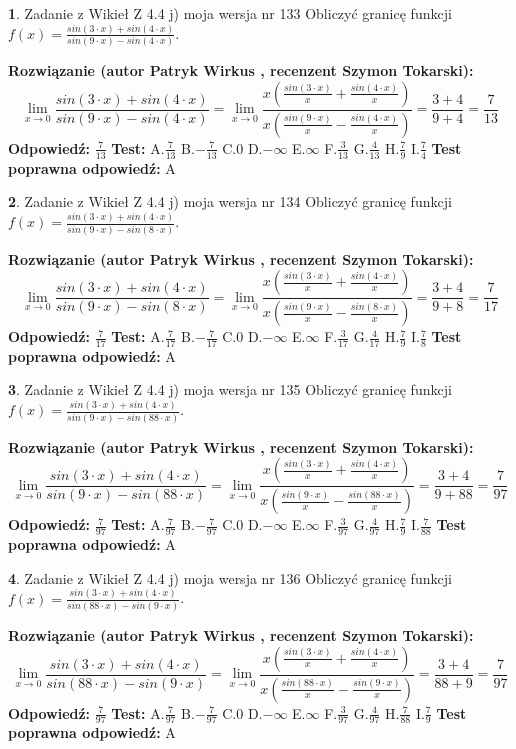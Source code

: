 \documentclass[12pt, a4paper]{article}
\theoremstyle{definition} %
\newtheorem{zad}{}
\newcommand{\zadStart}[1]{\begin{zad}#1\newline}
\newcommand{\zadStop}{\end{zad}}
\newcommand{\rozwStart}[2]{\noindent \textbf{Rozwiązanie (autor #1 , recenzent #2): }\newline}
\newcommand{\rozwStop}{\newline}
\newcommand{\odpStart}{\noindent \textbf{Odpowiedź:}\newline}
\newcommand{\odpStop}{\newline}
\newcommand{\testStart}{\noindent \textbf{Test:}\newline}
\newcommand{\testStop}{\newline}
\newcommand{\kluczStart}{\noindent \textbf{Test poprawna odpowiedź:}\newline}
\newcommand{\kluczStop}{\newline}
\begin{document}
\zadStart{Zadanie z Wikieł Z 4.4 j) moja wersja nr 133}
Obliczyć granicę funkcji $f(x)=\frac{sin(3\cdot x) +sin(4\cdot x)}{sin(9\cdot x) -sin(4\cdot x)}$.
\zadStop
\rozwStart{Patryk Wirkus}{Szymon Tokarski}
$$\lim\limits_{x\to 0}\frac{sin(3\cdot x) +sin(4\cdot x)}{sin(9\cdot x) -sin(4\cdot x)}=\lim\limits_{x\to 0}\frac{x(\frac{sin(3\cdot x)}{x}+\frac{sin(4\cdot x)}{x})}{x(\frac{sin(9\cdot x)}{x}-\frac{sin(4\cdot x)}{x})}=\frac{3+4}{9+4} = \frac{7}{13}$$
\rozwStop
\odpStart
$\frac{7}{13}$
\odpStop
\testStart
A.$\frac{7}{13}$
B.$-\frac{7}{13}$
C.$0$
D.$-\infty$
E.$\infty$
F.$\frac{3}{13}$
G.$\frac{4}{13}$
H.$\frac{7}{9}$
I.$\frac{7}{4}$
\testStop
\kluczStart
A
\kluczStop



\zadStart{Zadanie z Wikieł Z 4.4 j) moja wersja nr 134}
Obliczyć granicę funkcji $f(x)=\frac{sin(3\cdot x) +sin(4\cdot x)}{sin(9\cdot x) -sin(8\cdot x)}$.
\zadStop
\rozwStart{Patryk Wirkus}{Szymon Tokarski}
$$\lim\limits_{x\to 0}\frac{sin(3\cdot x) +sin(4\cdot x)}{sin(9\cdot x) -sin(8\cdot x)}=\lim\limits_{x\to 0}\frac{x(\frac{sin(3\cdot x)}{x}+\frac{sin(4\cdot x)}{x})}{x(\frac{sin(9\cdot x)}{x}-\frac{sin(8\cdot x)}{x})}=\frac{3+4}{9+8} = \frac{7}{17}$$
\rozwStop
\odpStart
$\frac{7}{17}$
\odpStop
\testStart
A.$\frac{7}{17}$
B.$-\frac{7}{17}$
C.$0$
D.$-\infty$
E.$\infty$
F.$\frac{3}{17}$
G.$\frac{4}{17}$
H.$\frac{7}{9}$
I.$\frac{7}{8}$
\testStop
\kluczStart
A
\kluczStop



\zadStart{Zadanie z Wikieł Z 4.4 j) moja wersja nr 135}
Obliczyć granicę funkcji $f(x)=\frac{sin(3\cdot x) +sin(4\cdot x)}{sin(9\cdot x) -sin(88\cdot x)}$.
\zadStop
\rozwStart{Patryk Wirkus}{Szymon Tokarski}
$$\lim\limits_{x\to 0}\frac{sin(3\cdot x) +sin(4\cdot x)}{sin(9\cdot x) -sin(88\cdot x)}=\lim\limits_{x\to 0}\frac{x(\frac{sin(3\cdot x)}{x}+\frac{sin(4\cdot x)}{x})}{x(\frac{sin(9\cdot x)}{x}-\frac{sin(88\cdot x)}{x})}=\frac{3+4}{9+88} = \frac{7}{97}$$
\rozwStop
\odpStart
$\frac{7}{97}$
\odpStop
\testStart
A.$\frac{7}{97}$
B.$-\frac{7}{97}$
C.$0$
D.$-\infty$
E.$\infty$
F.$\frac{3}{97}$
G.$\frac{4}{97}$
H.$\frac{7}{9}$
I.$\frac{7}{88}$
\testStop
\kluczStart
A
\kluczStop



\zadStart{Zadanie z Wikieł Z 4.4 j) moja wersja nr 136}
Obliczyć granicę funkcji $f(x)=\frac{sin(3\cdot x) +sin(4\cdot x)}{sin(88\cdot x) -sin(9\cdot x)}$.
\zadStop
\rozwStart{Patryk Wirkus}{Szymon Tokarski}
$$\lim\limits_{x\to 0}\frac{sin(3\cdot x) +sin(4\cdot x)}{sin(88\cdot x) -sin(9\cdot x)}=\lim\limits_{x\to 0}\frac{x(\frac{sin(3\cdot x)}{x}+\frac{sin(4\cdot x)}{x})}{x(\frac{sin(88\cdot x)}{x}-\frac{sin(9\cdot x)}{x})}=\frac{3+4}{88+9} = \frac{7}{97}$$
\rozwStop
\odpStart
$\frac{7}{97}$
\odpStop
\testStart
A.$\frac{7}{97}$
B.$-\frac{7}{97}$
C.$0$
D.$-\infty$
E.$\infty$
F.$\frac{3}{97}$
G.$\frac{4}{97}$
H.$\frac{7}{88}$
I.$\frac{7}{9}$
\testStop
\kluczStart
A
\kluczStop
\end{document}
